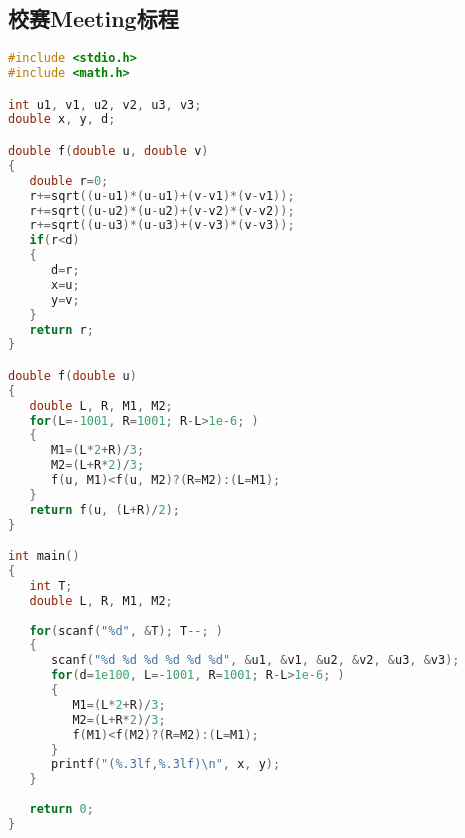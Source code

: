 \subsection{校赛Meeting标程}
\begin{lstlisting}[language=C++]
#include <stdio.h>
#include <math.h>

int u1, v1, u2, v2, u3, v3;
double x, y, d;

double f(double u, double v)
{
   double r=0;
   r+=sqrt((u-u1)*(u-u1)+(v-v1)*(v-v1));
   r+=sqrt((u-u2)*(u-u2)+(v-v2)*(v-v2));
   r+=sqrt((u-u3)*(u-u3)+(v-v3)*(v-v3));
   if(r<d)
   {
      d=r;
      x=u;
      y=v;
   }
   return r;
}

double f(double u)
{
   double L, R, M1, M2;
   for(L=-1001, R=1001; R-L>1e-6; )
   {
      M1=(L*2+R)/3;
      M2=(L+R*2)/3;
      f(u, M1)<f(u, M2)?(R=M2):(L=M1);
   }
   return f(u, (L+R)/2);
}

int main()
{
   int T;
   double L, R, M1, M2;
   
   for(scanf("%d", &T); T--; )
   {
      scanf("%d %d %d %d %d %d", &u1, &v1, &u2, &v2, &u3, &v3);
      for(d=1e100, L=-1001, R=1001; R-L>1e-6; )
      {
         M1=(L*2+R)/3;
         M2=(L+R*2)/3;
         f(M1)<f(M2)?(R=M2):(L=M1);
      }
      printf("(%.3lf,%.3lf)\n", x, y);
   }
   
   return 0;
}
\end{lstlisting}
